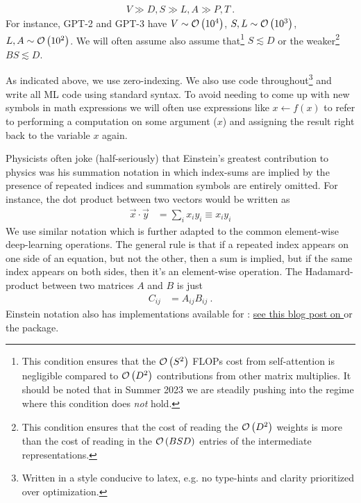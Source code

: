 \documentclass[11pt]{article}
\begin{document}
\begin{gather}
V \gg D, S \gg L, A \gg P, T \ .  \label{app_eq_transformers_approxs}
\end{gather}
For instance, GPT-2 and GPT-3 \cite{gpt2radford2019language, gpt3brown2020language} have $ V \sim
\mathcal{O} \left( 10 ^{ 4 } \right)  $, $ S, L \sim \mathcal{O} \left( 10 ^{ 3 } \right)  $, $ L, A \sim \mathcal{O}
\left( 10 ^{ 2 } \right)  $. We will often assume also assume that\footnote{This condition ensures
    that the $ \mathcal{O} \left( S ^{ 2 } \right)  $ FLOPs cost from self-attention is negligible
compared to $ \mathcal{O} \left( D ^{ 2 } \right)  $ contributions from other matrix multiplies.  It
should be noted that in Summer 2023 we are steadily pushing into the regime where this condition
does \textit{not}  hold.} $ S \lesssim D $ or the weaker\footnote{This condition ensures that the
cost of reading the $ \mathcal{O} \left( D ^{ 2 } \right)  $ weights is more than the cost of reading in
the $ \mathcal{O} \left( BSD \right)  $ entries of the intermediate representations.} $ BS \lesssim D $.

As indicated above,  we use zero-indexing. We also use  code
throughout\footnote{Written in a style conducive to latex, e.g. no type-hints and clarity
prioritized over optimization.}  and
write all ML code using standard  syntax. To avoid needing to come up with new
symbols in math expressions we will often use expressions like $ x \leftarrow f(x) $ to refer to performing
a computation on some argument ($ x $) and assigning the result right back to the variable $ x $
again.

Physicists often joke (half-seriously) that Einstein's greatest contribution to physics was his
summation notation in which index-sums are implied by the presence of repeated indices and summation
symbols are entirely omitted. For instance, the dot product between two vectors would be written as
\begin{align}
    \vec{x} \cdot \vec{y} &= \sum _{ i } x _{ i } y _{ i } \equiv x _{ i } y _{  i }
    \label{app_eq_einstein_sum}
\end{align}
We use similar notation which is further adapted to the common element-wise deep-learning
operations.  The general rule is that if a repeated index appears on one side of an equation, but
not the other, then a sum is implied, but if the same index appears on both sides, then it's an
element-wise operation. The Hadamard-product between two matrices $ A $ and $ B $ is just
\begin{align}
  C _{ ij } &= A _{ ij } B _{ ij }\ .
\end{align}
Einstein notation also has implementations available for :
\href{https://rockt.github.io/2018/04/30/einsum}{see this blog post on } or the
\href{https://einops.rocks/1-einops-basics/}{} package.
\end{document}
